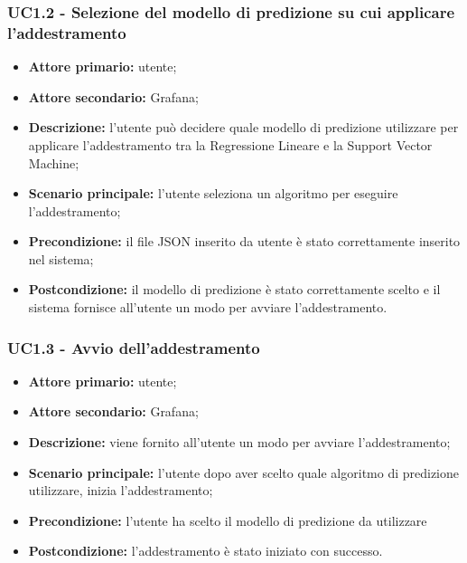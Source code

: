 \documentclass{article}
\begin{document}
	\subsubsection{UC1.2 - Selezione del modello di predizione su cui applicare l'addestramento}
	\begin{itemize}
		\item \textbf{Attore primario:} utente;
		\item \textbf{Attore secondario:} Grafana;
		\item \textbf{Descrizione:} l'utente può decidere quale modello di predizione utilizzare per applicare l'addestramento tra la Regressione Lineare e la Support Vector Machine;
		\item \textbf{Scenario principale:} l'utente seleziona un algoritmo per eseguire l'addestramento;
		\item \textbf{Precondizione:} il file JSON inserito da utente è stato correttamente inserito nel sistema;
		\item \textbf{Postcondizione:} il modello di predizione è stato correttamente scelto e il sistema fornisce all'utente un modo per avviare l'addestramento.
	\end{itemize}

	\subsubsection{UC1.3 - Avvio dell'addestramento}
	\begin{itemize}
		\item \textbf{Attore primario:} utente;
		\item \textbf{Attore secondario:} Grafana;
		\item \textbf{Descrizione:} viene fornito all'utente un modo per avviare l'addestramento;
		\item \textbf{Scenario principale:} l'utente dopo aver scelto quale algoritmo di predizione utilizzare, inizia l'addestramento; 
		\item \textbf{Precondizione:} l'utente ha scelto il modello di predizione da utilizzare
		\item \textbf{Postcondizione:} l'addestramento è stato iniziato con successo.
	\end{itemize}
\end{document}
